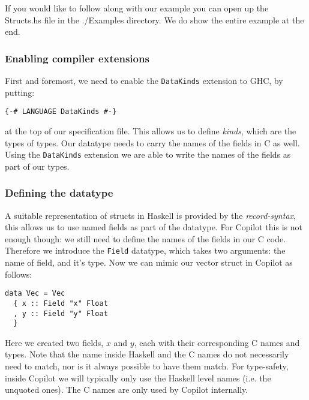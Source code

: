 If you would like to follow along with our example you can open up the Structs.hs file
in the ./Examples directory. We do show the entire example at the end. 

\subsubsection*{Enabling compiler extensions}
First and foremost, we need to enable the \texttt{DataKinds} extension to GHC,
by putting:
\begin{lstlisting}[language=Copilot]
{-# LANGUAGE DataKinds #-}
\end{lstlisting}
at the top of our specification file. This allows us to define \emph{kinds},
which are the types of types. Our datatype needs to carry the names of the
fields in C as well. Using the \texttt{DataKinds} extension we are able to
write the names of the fields as part of our types.


\subsubsection*{Defining the datatype}
A suitable representation of structs in Haskell is provided by the
\emph{record-syntax}, this allows us to use named fields as part of the
datatype. For Copilot this is not enough though: we still need to define the
names of the fields in our C code. Therefore we introduce the  \texttt{Field}
datatype, which takes two arguments: the name of field, and it's type. Now we
can mimic our vector struct in Copilot as follows:
\begin{lstlisting}[language=Copilot]
data Vec = Vec
  { x :: Field "x" Float
  , y :: Field "y" Float
  }
\end{lstlisting}
Here we created two fields, $x$ and $y$, each with their corresponding C names
and types. Note that the name inside Haskell and the C names do not necessarily
need to match, nor is it always possible to have them match. For type-safety,
inside Copilot we will typically only use the Haskell level names (i.e. the
unquoted ones). The C names are only used by Copilot internally.


